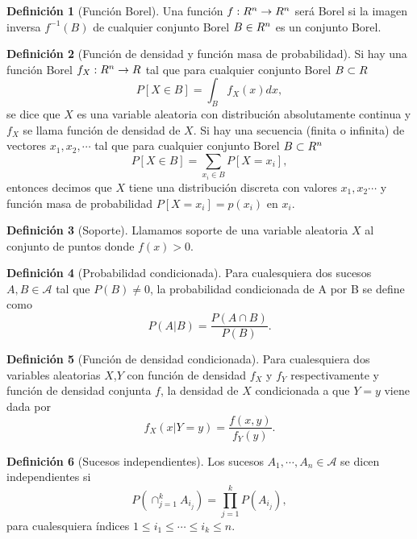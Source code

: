 \documentclass[10pt,a4paper]{article} %
\let\mathbb\relax
\theoremstyle{definition}
\newtheorem{definition}{Definición}[section]
\begin{document}
\begin{definition}[Función Borel]
  Una función $f:\mathbb{R}^n\to \mathbb{R}^n$ será Borel si la imagen inversa $f^{-1}(B)$ de cualquier conjunto Borel $B\in \mathbb{R}^n$ es un conjunto Borel.
\end{definition}

\begin{definition}[Función de densidad y función masa de probabilidad]
  Si hay una función Borel $f_X:\mathbb{R}^n\to \mathbb{R}$ tal que para cualquier conjunto Borel $B\subset \mathbb{R}$\[
P[X\in B] = \int_B f_X(x) dx,
\]
se dice que $X$ es una variable aleatoria con distribución absolutamente continua y $f_X$ se llama función de densidad de $X$. Si hay una secuencia (finita o infinita) de vectores $x_1,x_2,\cdots$ tal que para cualquier conjunto Borel $B\subset \mathbb{R}^n$\[
P[X\in B] = \sum_{x_i\in B}P[X = x_i],
\]
entonces decimos que $X$ tiene una distribución discreta con valores $x_1,x_2\cdots$ y función masa de probabilidad $P[X=x_i]=p(x_i)$ en $x_i$.
\end{definition}

\begin{definition}[Soporte]
Llamamos soporte de una variable aleatoria $X$ al conjunto de puntos donde $f(x)>0$.
\end{definition}

  

\begin{definition}[Probabilidad condicionada]
  Para cualesquiera dos sucesos $A,B \in \mathcal{A}$ tal que $P(B)\neq 0$, la probabilidad condicionada de A por B se define como\[
P(A|B) = \frac{P(A\cap B)}{P(B)}.
  \]
\end{definition}

\begin{definition}[Función de densidad condicionada]
  Para cualesquiera dos variables aleatorias $X$,$Y$ con función de densidad $f_X$ y $f_Y$ respectivamente y función de densidad conjunta $f$, la densidad de $X$ condicionada a que $Y=y$ viene dada por\[
f_X(x|Y=y) = \frac{f(x,y)}{f_Y(y)}.
  \]
\end{definition}

\begin{definition}[Sucesos independientes]
  Los sucesos $A_1,\cdots,A_n\in \mathcal{A}$ se dicen independientes si\[
P\left (\cap_{j=1}^kA_{i_j} \right ) = \prod_{j=1}^kP\left (A_{i_j} \right),
\]
para cualesquiera índices $1\leq i_1\leq \cdots \leq i_k\leq n$.
\end{definition}
\end{document}
